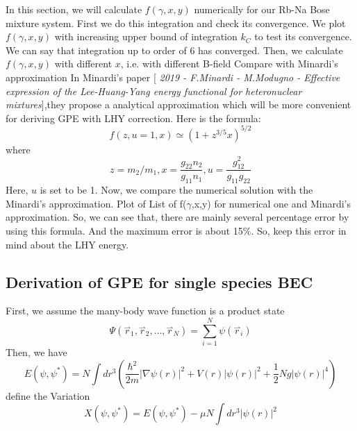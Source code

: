 In this section, we will calculate $f(\gamma ,x,y)$ numerically for our Rb-Na Bose mixture system.
First we do this integration and check its convergence. We plot $f(\gamma ,x,y)$ with increasing upper bound of integration $k_C$ to test its convergence.
We can say that integration up to order of 6 has converged. 
Then, we calculate $f(\gamma ,x,y)$ with different $x$, i.e. with different B-field
Compare with Minardi's approximation
In Minardi's paper [\textit{ 2019 - F.Minardi - M.Modugno - Effective expression of the Lee-Huang-Yang energy functional for heteronuclear mixtures}],they propose a analytical approximation which will be more convenient for deriving GPE with LHY correction. Here is the formula:
\begin{equation}
f(z,u=1,x)\simeq \left(1+z^{3/5}x\right)^{5/2}
\end{equation}
where
\begin{equation}
z=m_2/m_1, x=\frac{g_{22}n_2}{g_{11}n_1},u=\frac{g_{12}^2}{g_{11}g_{22}}
\end{equation}
Here, $u$ is set to be 1.
Now, we compare the numerical solution with the Minardi's approximation.
Plot of List of f($\gamma $,x,y) for numerical one and Minardi's approximation.
So, we can see that, there are mainly several percentage error by using this formula. And the maximum error is about 15$\%$. So, keep this error
in mind about the LHY energy.

\subsection{Derivation of GPE for single species BEC}

First, we assume the many-body wave function is a product state
\begin{equation}
\Psi \left(\overset{\rightharpoonup }{r}_1,\overset{\rightharpoonup }{r}_2,\ldots  ,\overset{\rightharpoonup }{r}_N\right)=\sum _{i=1}^N \psi \left(\overset{\rightharpoonup}{r}_i\right)
\end{equation}
Then, we have
\begin{equation}
E\left(\psi ,\psi ^*\right)=N\int dr^3\left(\frac{\hbar ^2}{2m}\left| \nabla \psi (r)\right| ^2+V(r)\left| \psi (r)\right| ^2+\frac{1}{2}N g\left|\psi (r)\right| ^4\right)
\end{equation}
define the Variation
\begin{equation}X\left(\psi ,\psi ^*\right)=E\left(\psi ,\psi ^*\right)-\mu  N\int dr^3\left| \psi (r)\right| ^2\end{equation}

